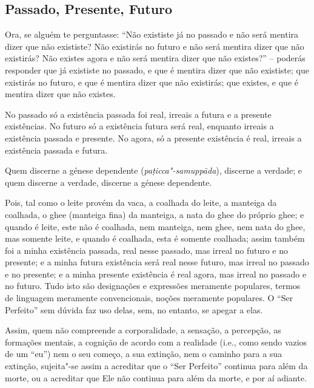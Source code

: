 \subsection{Passado, Presente, Futuro}

Ora, se alguém te perguntasse: “Não exististe já no passado e não será mentira
dizer que não exististe? Não existirás no futuro e não será mentira dizer que
não existirás? Não existes agora e não será mentira dizer que não existes?” --
poderás responder que já exististe no passado, e que é mentira dizer que não
exististe; que existirás no futuro, e que é mentira dizer que não existirás; que
existes, e que é mentira dizer que não existes.

No passado só a existência passada foi real, irreais a futura e a presente
existências. No futuro só a existência futura será real, enquanto irreais a
existência passada e presente. No agora, só a presente existência é real,
irreais a existência passada e futura.


Quem discerne a génese dependente (\emph{paṭicca"-samuppāda}), discerne a
verdade; e quem discerne a verdade, discerne a génese dependente.


Pois, tal como o leite provém da vaca, a coalhada do leite, a manteiga da
coalhada, o ghee (manteiga fina) da manteiga, a nata do ghee do próprio ghee; e
quando é leite, este não é coalhada, nem manteiga, nem ghee, nem nata do ghee,
mas somente leite, e quando é coalhada, esta é somente coalhada; assim também
foi a minha existência passada, real nesse passado, mas irreal no futuro e no
presente; e a minha futura existência será real nesse futuro, mas irreal no
passado e no presente; e a minha presente existência é real agora, mas irreal no
passado e no futuro. Tudo isto são designações e expressões meramente populares,
termos de linguagem meramente convencionais, noções meramente populares. O “Ser
Perfeito” sem dúvida faz uso delas, sem, no entanto, se apegar a elas.


Assim, quem não compreende a corporalidade, a sensação, a percepção, as
formações mentais, a cognição de acordo com a realidade (i.e., como sendo vazios
de um “eu”) nem o seu começo, a sua extinção, nem o caminho para a sua
extinção, sujeita"-se assim a acreditar que o “Ser Perfeito” continua para além
da morte, ou a acreditar que Ele não continua para além da morte, e por aí
adiante.

